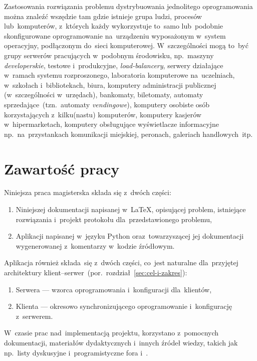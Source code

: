 \documentclass[thesis]{subfiles}
\begin{document}
Zastosowania rozwiązania problemu dystrybuowania jednolitego oprogramowania można znaleźć wszędzie tam gdzie istnieje grupa ludzi, procesów lub~komputerów, z~których każdy wykorzystuje to~samo lub~podobnie skonfigurowane oprogramowanie na~urządzeniu wyposażonym w~system operacyjny, podłączonym do~sieci komputerowej. W~szczególności mogą to~być grupy serwerów pracujących w~podobnym środowisku, np.~maszyny \emph{developerskie}, testowe i~produkcyjne, \emph{load-balancery}, serwery działające w~ramach systemu rozproszonego, laboratoria komputerowe na~uczelniach, w~szkołach i~bibliotekach, biura, komputery administracji publicznej (w~szczególności w~urzędach), bankomaty, biletomaty, automaty sprzedające~(tzn.~automaty \emph{vendingowe}), komputery osobiste osób korzystających z~kilku(nastu) komputerów, komputery kasjerów w~hipermarketach, komputery obsługujące wyświetlacze informacyjne np.~na~przystankach komunikacji miejskiej, peronach, galeriach handlowych~itp.


\section{Zawartość pracy}

\noindent Niniejsza praca magisterska składa się z~dwóch części:\mynobreakpar
\begin{enumerate}
	\item Niniejszej dokumentacji napisanej w~\LaTeX, opisującej problem, istniejące rozwiązania i~projekt protokołu dla~przedstawionego problemu,
	\item Aplikacji napisanej w~języku Python oraz~towarzyszącej jej dokumentacji wygenerowanej z~komentarzy w~kodzie źródłowym.
\end{enumerate}
Aplikacja również składa~się z~dwóch części, co~jest naturalne dla~przyjętej architektury klient--serwer~(por.~rozdział~\ref{sec:cel-i-zakres}):\mynobreakpar
\begin{enumerate}
	\item Serwera --- wzorca oprogramowania i~konfiguracji dla~klientów,
	\item Klienta --- okresowo synchronizującego oprogramowanie i~konfigurację z~serwerem.
\end{enumerate}

W~czasie prac nad~implementacją projektu, korzystano z~pomocnych dokumentacji, materiałów dydaktycznych i~innych źródeł wiedzy, takich jak np.~listy dyskusyjne i~programistyczne fora  i~.
\end{document}
